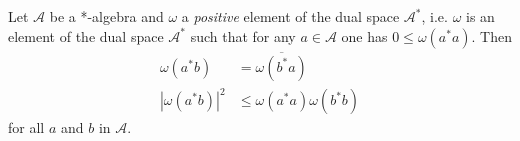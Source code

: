 \begin{lemma}
    \label{lmm:cauchy-schwarz-inequality}
    \leanok
    Let $\mathcal{A}$ be a *-algebra and $\omega$ a \textit{positive} element of the dual space $\mathcal{A}^*$, i.e. $\omega$ is an element of the dual space $\mathcal{A}^*$ such that for any $a \in \mathcal{A}$ one has $0 \le \omega(a^*a)$. Then
    \begin{align}
        \omega(a^*b) &= \overline{\omega(b^*a)} \\
        |\omega(a^*b)|^2 &\le \omega(a^*a) \omega(b^*b)
    \end{align}
    for all $a$ and $b$ in $\mathcal{A}$.
\end{lemma}
